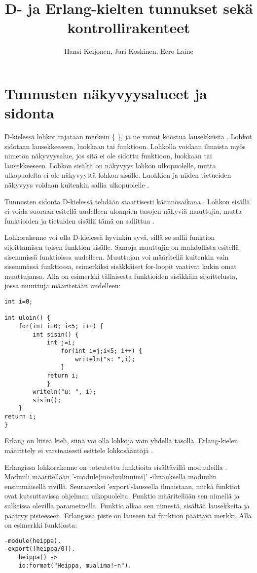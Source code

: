 \documentclass[11pt,oneside,a4paper]{article}
\title{D- ja Erlang-kielten tunnukset sekä kontrollirakenteet}
\author{Hansi Keijonen, Jari Koskinen, Eero Laine}
\begin{document}
\maketitle

\newpage

\section{Tunnusten näkyvyysalueet ja sidonta}


D-kielessä lohkot rajataan merkein \{ \}, ja ne voivat koostua lausekkeista \cite{DLA13}. Lohkot sidotaan lausekkeeseen, luokkaan tai funktioon. Lohkolla voidaan ilmaista myös nimetön näkyvyysalue, jos sitä ei ole sidottu funktioon, luokkaan tai lausekkeeseen. Lohkon sisältä on näkyvyys lohkon ulkopuolelle, mutta ulkopuolelta ei ole näkyvyyttä lohkon sisälle. Luokkien ja niiden tietueiden näkyvyys voidaan kuitenkin sallia ulkopuolelle \cite{DLA13}.

Tunnusten sidonta D-kielessä tehdään staattisesti käännösaikana \cite{DLA13}. Lohkon sisällä ei voida suoraan esitellä uudelleen ulompien tasojen näkyviä muuttujia, mutta funktioiden ja tietuiden sisällä tämä on sallittua \cite{DLA13}.

Lohkorakenne voi olla D-kielessä hyvinkin syvä, sillä se sallii funktion sijoittamisen toisen funktion sisälle. Samoja muuttujia on mahdollista esitellä sisemmissä funktioissa uudelleen. Muuttujan voi määritellä kuitenkin vain sisemmässä funktiossa, esimerkiksi sisäkkäiset for-loopit vaativat kukin omat muuttujansa. Alla on esimerkki tällaisesta funktioiden sisäkkäin sijoittelusta, jossa muuttuja määritetään uudelleen:



\begin{verbatim}
int i=0;

int uloin() {
    for(int i=0; i<5; i++) {
        int sisin() {
            int j=i;
                for(int i=j;i<5; i++) {
                    writeln("s: ",i);
                }
            return i;
            }
        writeln("u: ", i);
        sisin();
    }
return i;
}
\end{verbatim}

Erlang on litteä kieli, siinä voi olla lohkoja vain yhdellä tasolla.
Erlang-kielen määrittely ei varsinaisesti esittele lohkosääntöjä \cite{ERL99}.

Erlangissa lohkorakenne on toteutettu funktioita sisältävillä moduuleilla \cite{HEB13}. Moduuli määritellään '-module(moduulin\textunderscore nimi)' -ilmauksella moduulin ensimmäisellä rivillä.
Seuraavaksi 'export'-lauseella ilmaistaan, mitkä funktiot ovat kutsuttavissa ohjelman ulkopuolelta. Funktio määritellään sen nimellä ja sulkeissa olevilla parametreilla. Funktio alkaa sen nimestä, sisältää lausekkeita ja päättyy pisteeseen. Erlangissa piste on lauseen tai funktion päättävä merkki. Alla on esimerkki funktiosta:
\begin{verbatim}
-module(heippa).
-export([heippa/0]).
    heippa() ->
    io:format("Heippa, mualima!~n").
\end{verbatim}
\end{document}
